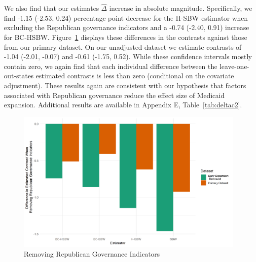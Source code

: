 \documentclass[aoas]{imsart}
\theoremstyle{plain}
\theoremstyle{remark}
\begin{document}
We also find that our estimates $\hat{\Delta}$ increase in absolute magnitude. Specifically, we find -1.15 (-2.53, 0.24) percentage point decrease for the H-SBW estimator when excluding the Republican governance indicators and a -0.74 (-2.40, 0.91) increase for BC-HSBW. Figure~\ref{fig:repub} displays these differences in the contrasts against those from our primary dataset. On our unadjusted dataset we estimate contrasts of -1.04 (-2.01, -0.07) and -0.61 (-1.75, 0.52). While these confidence intervals mostly contain zero, we again find that each individual difference between the leave-one-out-states estimated contrasts is less than zero (conditional on the covariate adjustment). These results again are consistent with our hypothesis that factors associated with Republican governance reduce the effect size of Medicaid expansion. Additional results are available in Appendix E, Table~\ref{tab:deltac2}. 

\begin{figure}
\begin{center}
    \caption{Removing Republican Governance Indicators}
    \label{fig:repub}
    \includegraphics[scale=0.6]{01_Plots/repub-diff-c1c2.png}
\end{center}
\end{figure}
\end{document}
